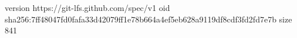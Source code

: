 version https://git-lfs.github.com/spec/v1
oid sha256:7ff48047fd0fafa33d42079ff1e78b664a4ef5eb628a9119df8cdf3fd2fd7e7b
size 841
